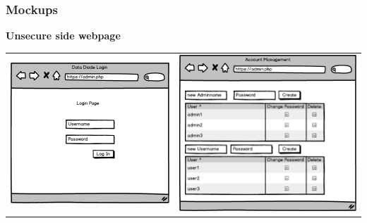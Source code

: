 \documentclass[a4paper,11pt]{article}
\begin{document}
\subsubsection{Mockups}
\textbf{Unsecure side webpage}
\begin{center}
\begin{tabular}{cc}
\includegraphics[scale=0.5]{img/outsideLogin.png} & \includegraphics[scale=0.45]{img/outsideManagement.png}\\
\end{tabular}
\end{center} 
\end{document}
